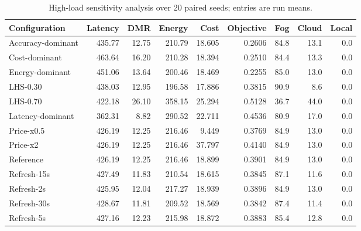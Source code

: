 \begin{table}[t]
\centering
\caption{High-load sensitivity analysis over 20 paired seeds; entries are run means.}
\label{tab:independent_sensitivity}
\scriptsize
\begin{tabular}{lrrrrrrrr}
\toprule
Configuration & Latency & DMR & Energy & Cost & Objective & Fog & Cloud & Local \\
\midrule
Accuracy-dominant & 435.77 & 12.75 & 210.79 & 18.605 & 0.2606 & 84.8 & 13.1 & 0.0 \\
Cost-dominant & 463.64 & 16.20 & 210.28 & 18.394 & 0.2510 & 84.4 & 13.3 & 0.0 \\
Energy-dominant & 451.06 & 13.64 & 200.46 & 18.469 & 0.2255 & 85.0 & 13.0 & 0.0 \\
LHS-0.30 & 438.03 & 12.95 & 196.58 & 17.886 & 0.3815 & 90.9 & 8.6 & 0.0 \\
LHS-0.70 & 422.18 & 26.10 & 358.15 & 25.294 & 0.5128 & 36.7 & 44.0 & 0.0 \\
Latency-dominant & 362.31 & 8.82 & 290.52 & 22.711 & 0.4536 & 80.9 & 17.0 & 0.0 \\
Price-x0.5 & 426.19 & 12.25 & 216.46 & 9.449 & 0.3769 & 84.9 & 13.0 & 0.0 \\
Price-x2 & 426.19 & 12.25 & 216.46 & 37.797 & 0.4140 & 84.9 & 13.0 & 0.0 \\
Reference & 426.19 & 12.25 & 216.46 & 18.899 & 0.3901 & 84.9 & 13.0 & 0.0 \\
Refresh-15s & 427.49 & 11.83 & 210.54 & 18.615 & 0.3845 & 87.1 & 11.6 & 0.0 \\
Refresh-2s & 425.95 & 12.04 & 217.27 & 18.939 & 0.3896 & 84.9 & 13.0 & 0.0 \\
Refresh-30s & 428.67 & 11.81 & 209.52 & 18.569 & 0.3842 & 87.4 & 11.4 & 0.0 \\
Refresh-5s & 427.16 & 12.23 & 215.98 & 18.872 & 0.3883 & 85.4 & 12.8 & 0.0 \\
\bottomrule
\end{tabular}
\end{table}


